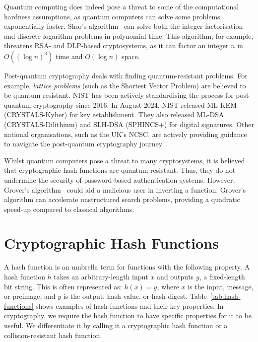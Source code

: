Quantum computing does indeed pose a threat to some of the computational hardness assumptions, as quantum computers can solve some problems exponentially faster. Shor's algorithm~\cite{shor_polynomial-time_1997} can solve both the integer factorisation and discrete logarithm problems in polynomial time. This algorithm, for example, threatens RSA- and DLP-based cryptosystems, as it can factor an integer $n$ in $O((\log n)^3)$ time and $O(\log n)$ space.

Post-quantum cryptography deals with finding quantum-resistant problems. For example, \textit{lattice problems} (such as the Shortest Vector Problem) are believed to be quantum resistant. NIST has been actively standardising the process for post-quantum cryptography since 2016. In August 2024, NIST released ML-KEM (CRYSTALS-Kyber) for key establishment. They also released ML-DSA (CRYSTALS-Dilithium) and SLH-DSA (SPHINCS+) for digital signatures. Other national organisations, such as the UK's NCSC, are actively providing guidance to navigate the post-quantum cryptography journey~\cite{ncsc_next_nodate}.

Whilst quantum computers pose a threat to many cryptosystems, it is believed that cryptographic hash functions are quantum resistant. Thus, they do not undermine the security of password-based authentication systems. However, Grover's algorithm~\cite{grover_fast_1996} could aid a malicious user in inverting a function. Grover's algorithm can accelerate unstructured search problems, providing a quadratic speed-up compared to classical algorithms.

\section{Cryptographic Hash Functions}

A hash function is an umbrella term for functions with the following property. A hash function $h$ takes an arbitrary-length input $x$ and outputs $y$, a fixed-length bit string. This is often represented as: $h(x) = y$, where $x$ is the input, message, or preimage, and $y$ is the output, hash value, or hash digest. Table~\ref{tab:hash-functions} shows examples of hash functions and their key properties. In cryptography, we require the hash function to have specific properties for it to be useful. We differentiate it by calling it a cryptographic hash function or a collision-resistant hash function.

